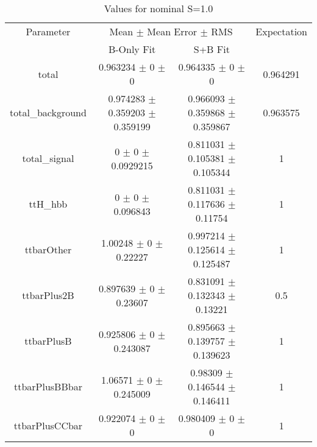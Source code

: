 \begin{table}
\centering
\caption{Values for nominal S=1.0}
\begin{tabular}{cccc}
\toprule
Parameter & \multicolumn{2}{c}{Mean $\pm$ Mean Error $\pm$ RMS} & Expectation\\
 & B-Only Fit & S+B Fit & \\
\midrule
total & \num{0.963234} $\pm$ \num{0} $\pm$ \num{0} & \num{0.964335} $\pm$ \num{0} $\pm$ \num{0} & \num{0.964291}\\
total\_background & \num{0.974283} $\pm$ \num{0.359203} $\pm$ \num{0.359199} & \num{0.966093} $\pm$ \num{0.359868} $\pm$ \num{0.359867} & \num{0.963575}\\
total\_signal & \num{0} $\pm$ \num{0} $\pm$ \num{0.0929215} & \num{0.811031} $\pm$ \num{0.105381} $\pm$ \num{0.105344} & \num{1}\\
ttH\_hbb & \num{0} $\pm$ \num{0} $\pm$ \num{0.096843} & \num{0.811031} $\pm$ \num{0.117636} $\pm$ \num{0.11754} & \num{1}\\
ttbarOther & \num{1.00248} $\pm$ \num{0} $\pm$ \num{0.22227} & \num{0.997214} $\pm$ \num{0.125614} $\pm$ \num{0.125487} & \num{1}\\
ttbarPlus2B & \num{0.897639} $\pm$ \num{0} $\pm$ \num{0.23607} & \num{0.831091} $\pm$ \num{0.132343} $\pm$ \num{0.13221} & \num{0.5}\\
ttbarPlusB & \num{0.925806} $\pm$ \num{0} $\pm$ \num{0.243087} & \num{0.895663} $\pm$ \num{0.139757} $\pm$ \num{0.139623} & \num{1}\\
ttbarPlusBBbar & \num{1.06571} $\pm$ \num{0} $\pm$ \num{0.245009} & \num{0.98309} $\pm$ \num{0.146544} $\pm$ \num{0.146411} & \num{1}\\
ttbarPlusCCbar & \num{0.922074} $\pm$ \num{0} $\pm$ \num{0} & \num{0.980409} $\pm$ \num{0} $\pm$ \num{0} & \num{1}\\
\bottomrule
\end{tabular}
\end{table}